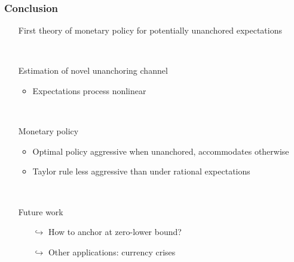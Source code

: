 \documentclass[10pt]{beamer}
\def\movei{12 }
\begin{document}
\begin{frame}
	\frametitle{Conclusion}

\vspace{0.5cm}
	
\begin{itemize}
\item[] First theory of monetary policy for potentially unanchored expectations 

\

\item[] Estimation of novel unanchoring channel
\vspace{0.1cm}
	\begin{itemize}
	\item Expectations process nonlinear
%
	\end{itemize}
\


\item[] Monetary policy
\vspace{0.1cm}

	\begin{itemize}
	\item Optimal policy aggressive when unanchored, accommodates otherwise
	\vspace{0.1cm}
	



	\item Taylor rule less aggressive than under rational expectations
	\end{itemize}
	
\


\item[] Future work
\vspace{0.1cm}

\begin{itemize}
\item[$\hookrightarrow$]  How to anchor at zero-lower bound?
\vspace{0.1cm}

\item[$\hookrightarrow$]  Other applications: currency crises
\end{itemize}


\end{itemize}


\end{frame}
\end{document}
